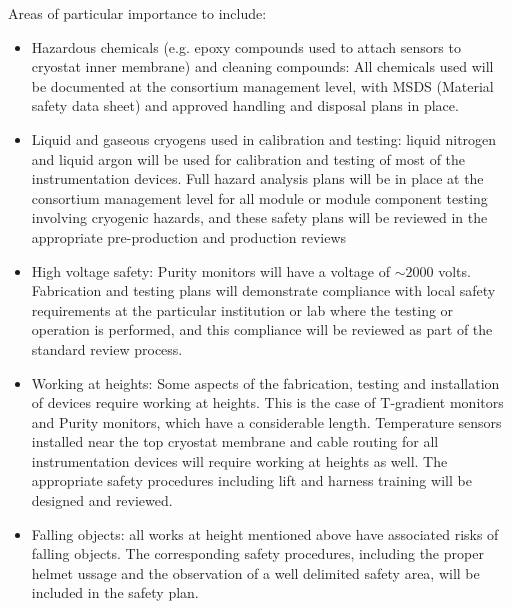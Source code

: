 Areas of particular importance to  include:
\begin{itemize}
\item Hazardous chemicals (e.g. epoxy compounds used to attach sensors to cryostat inner membrane) and cleaning compounds:
  All chemicals used will be documented at the consortium management level, with MSDS (Material safety data sheet) and approved handling and disposal plans in place.

\item Liquid and gaseous cryogens used in calibration and testing: liquid nitrogen and liquid argon will be used for calibration and testing of most of the instrumentation devices.
  Full hazard analysis plans will be in place at the consortium management level for all module or
  module component testing involving cryogenic hazards, and these safety plans will be reviewed in the appropriate pre-production and production reviews

\item High voltage safety:  Purity monitors will have a voltage of $\sim 2000$ volts. Fabrication and testing plans will demonstrate compliance with local
   safety requirements at the particular institution or lab where the testing or operation is performed, and this compliance will be reviewed as part of the standard review process.


\item Working at heights: Some aspects of the fabrication, testing and installation of  devices require working at heights. This is the 
  case of T-gradient monitors and Purity monitors, which have a considerable length. Temperature sensors installed near the top cryostat membrane and cable routing for all instrumentation devices
  will require working at heights as well. The appropriate safety procedures including lift and harness training will be designed and reviewed. 
  
\item Falling objects: all works at height mentioned above have associated risks of falling objects. The corresponding safety procedures, including the proper helmet ussage 
  and the observation of a well delimited safety area, will be included in the safety plan. 
\end{itemize}
  

  

